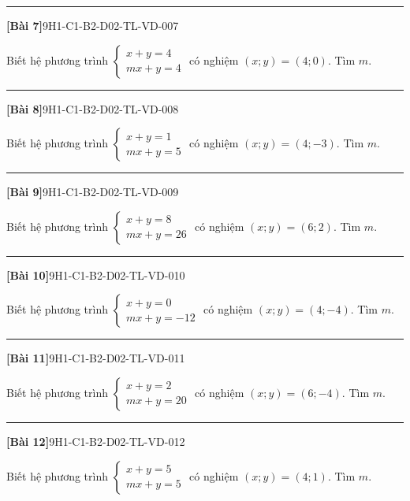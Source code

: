 \documentclass[12pt,a4paper]{article}
\newif\ifloigiai
\newenvironment{cauhoi}[2]{%
  \par\medskip\noindent\rule{\textwidth}{0.4pt}\par\nopagebreak
  \noindent\textbf{[#1]}\hfill{\scriptsize\ttfamily #2}\par\nopagebreak\smallskip}{\par}
\newcommand{\loigiai}[1]{\ifloigiai\par\smallskip\noindent\textit{Lời giải.} #1\par\fi}
\begin{document}
\begin{cauhoi}{Bài 7}{9H1-C1-B2-D02-TL-VD-007}
Biết hệ phương trình $\begin{cases}x+y=4\\ mx+y=4\end{cases}$ có nghiệm $(x;y)=(4;0)$. Tìm $m$.
\loigiai{Thay $x=4$, $y=0$ vào phương trình thứ hai: $4 m+0=4$ nên $m=\dfrac{4-0}{4}=1$.}
\end{cauhoi}
\begin{cauhoi}{Bài 8}{9H1-C1-B2-D02-TL-VD-008}
Biết hệ phương trình $\begin{cases}x+y=1\\ mx+y=5\end{cases}$ có nghiệm $(x;y)=(4;-3)$. Tìm $m$.
\loigiai{Thay $x=4$, $y=-3$ vào phương trình thứ hai: $4 m-3=5$ nên $m=\dfrac{5+3}{4}=2$.}
\end{cauhoi}
\begin{cauhoi}{Bài 9}{9H1-C1-B2-D02-TL-VD-009}
Biết hệ phương trình $\begin{cases}x+y=8\\ mx+y=26\end{cases}$ có nghiệm $(x;y)=(6;2)$. Tìm $m$.
\loigiai{Thay $x=6$, $y=2$ vào phương trình thứ hai: $6 m+2=26$ nên $m=\dfrac{26-2}{6}=4$.}
\end{cauhoi}
\begin{cauhoi}{Bài 10}{9H1-C1-B2-D02-TL-VD-010}
Biết hệ phương trình $\begin{cases}x+y=0\\ mx+y=-12\end{cases}$ có nghiệm $(x;y)=(4;-4)$. Tìm $m$.
\loigiai{Thay $x=4$, $y=-4$ vào phương trình thứ hai: $4 m-4=-12$ nên $m=\dfrac{-12+4}{4}=-2$.}
\end{cauhoi}
\begin{cauhoi}{Bài 11}{9H1-C1-B2-D02-TL-VD-011}
Biết hệ phương trình $\begin{cases}x+y=2\\ mx+y=20\end{cases}$ có nghiệm $(x;y)=(6;-4)$. Tìm $m$.
\loigiai{Thay $x=6$, $y=-4$ vào phương trình thứ hai: $6 m-4=20$ nên $m=\dfrac{20+4}{6}=4$.}
\end{cauhoi}
\begin{cauhoi}{Bài 12}{9H1-C1-B2-D02-TL-VD-012}
Biết hệ phương trình $\begin{cases}x+y=5\\ mx+y=5\end{cases}$ có nghiệm $(x;y)=(4;1)$. Tìm $m$.
\loigiai{Thay $x=4$, $y=1$ vào phương trình thứ hai: $4 m+1=5$ nên $m=\dfrac{5-1}{4}=1$.}
\end{cauhoi}
\end{document}

